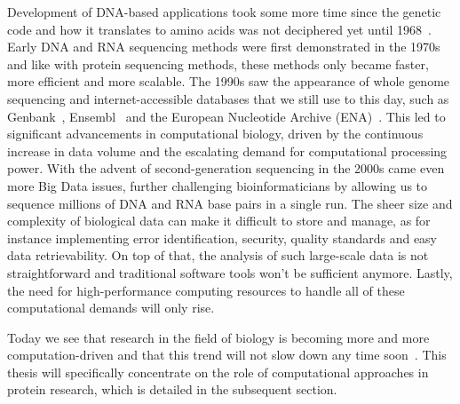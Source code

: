 Development of DNA-based applications took some more time since the genetic code and how it translates to amino acids was not deciphered yet until 1968~\cite{codon}. Early DNA and RNA sequencing methods were first demonstrated in the 1970s~\cite{dnaseq, rna} and like with protein sequencing methods, these methods only became faster, more efficient and more scalable. The 1990s saw the appearance of whole genome sequencing and internet-accessible databases that we still use to this day, such as Genbank~\cite{genbank}, Ensembl~\cite{ensembl} and the European Nucleotide Archive (ENA)~\cite{ena}. This led to significant advancements in computational biology, driven by the continuous increase in data volume and the escalating demand for computational processing power. With the advent of second-generation sequencing in the 2000s came even more Big Data issues, further challenging bioinformaticians by allowing us to sequence millions of DNA and RNA base pairs in a single run. The sheer size and complexity of biological data can make it difficult to store and manage, as for instance implementing error identification, security, quality standards and easy data retrievability. On top of that, the analysis of such large-scale data is not straightforward and traditional software tools won't be sufficient anymore. Lastly, the need for high-performance computing resources to handle all of these computational demands will only rise.

Today we see that research in the field of biology is becoming more and more computation-driven and that this trend will not slow down any time soon~\cite{compbio}. This thesis will specifically concentrate on the role of computational approaches in protein research, which is detailed in the subsequent section.